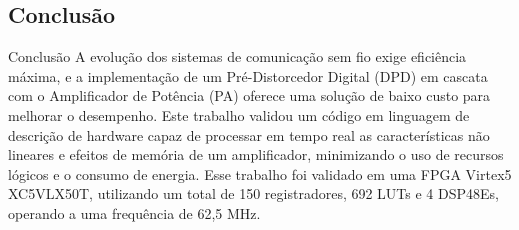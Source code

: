 \documentclass{if-beamer}
\begin{document}
\subsection{Conclusão}
\begin{frame}{Conclusão}
		A evolução dos sistemas de comunicação sem fio exige eficiência máxima, e a implementação de um Pré-Distorcedor Digital (DPD) em cascata com o Amplificador de Potência (PA) oferece uma solução de baixo custo para melhorar o desempenho. Este trabalho validou um código em linguagem de descrição de hardware capaz de processar em tempo real as características não lineares e efeitos de memória de um amplificador, minimizando o uso de recursos lógicos e o consumo de energia. Esse trabalho foi validado em uma  FPGA Virtex5 XC5VLX50T, utilizando um total de 150 registradores, 692 LUTs e 4 DSP48Es, operando a uma frequência de 62,5 MHz.  
\end{frame}
\end{document}
